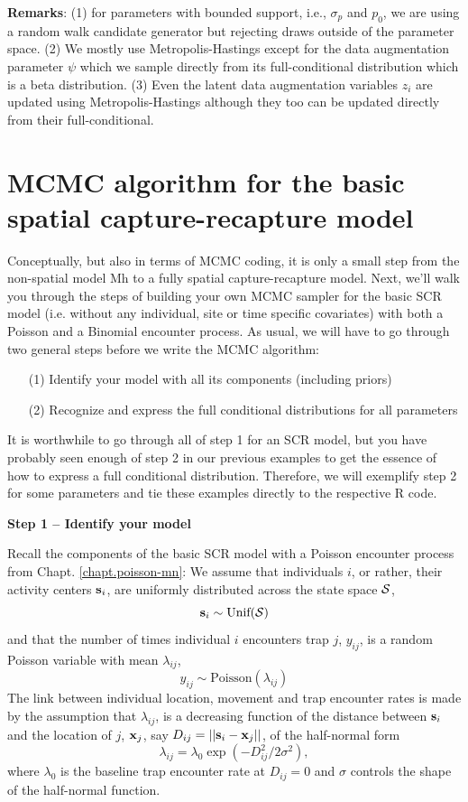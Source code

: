 {\bf Remarks}: (1) for parameters with bounded support, i.e.,
$\sigma_{p}$ and $p_{0}$, we are using a random walk candidate
generator but rejecting draws outside of the parameter space.  (2) We
mostly use Metropolis-Hastings except for the data augmentation
parameter $\psi$ which we sample directly from its full-conditional
distribution which is a beta distribution.  (3) Even the latent data
augmentation variables $z_{i}$ are updated using Metropolis-Hastings
although they too can be updated directly from their full-conditional.

\section{MCMC algorithm for the basic spatial capture-recapture model}

Conceptually, but also in terms of MCMC coding, it is only a small step from the non-spatial model Mh to a fully spatial capture-recapture model. Next, we'll walk you through the steps of building your own MCMC sampler for the basic SCR model (i.e. without any individual, site or time specific covariates) with both a Poisson and a Binomial encounter process.
As usual, we will have to go through two general steps before we write the MCMC algorithm:
\begin{itemize}
\item[  (1)] Identify your model with all its components (including
    priors)
\item[  (2)] Recognize and express the full conditional distributions for
    all parameters
\end{itemize}
It is worthwhile to go through all of step 1 for an SCR model, but you
have probably seen enough of step 2 in our previous examples to get
the essence of how to express a full conditional
distribution. Therefore, we will exemplify step 2 for some parameters
and tie these examples directly to the respective R code.

{\bf Step 1 -- Identify your model}

Recall the components of the basic SCR model with a Poisson encounter process from Chapt. \ref{chapt.poisson-mn}:
We assume that individuals $i$, or rather, their activity centers
${\bf s}_i$, are uniformly distributed across the state space ${\cal S}$,
\[
{\bf s}_i  \sim \mbox{Unif}({\cal S})
\]
and that the number of times individual $i$ encounters trap $j$, $y_{ij}$, is a random Poisson variable with mean $\lambda_{ij}$,
\[
y_{ij} \sim \mbox{Poisson}(\lambda_{ij})
\]
The link between individual location, movement and trap encounter
rates is made by the assumption that $\lambda_{ij}$, is a decreasing
function of the distance between ${\bf s}_i$ and the location of $j$,
${\bf x}_{j}$, say $D_{ij} = ||{\bf s}_{i} - {\bf x}_{j}||$, of the half-normal form
\[
\lambda_{ij} =  \lambda_0  \exp(-D_{ij}^2/2\sigma^2),
\]
where $\lambda_0$ is the baseline trap encounter rate at $D_{ij}=0$ and $\sigma$ controls the shape of the half-normal function.

